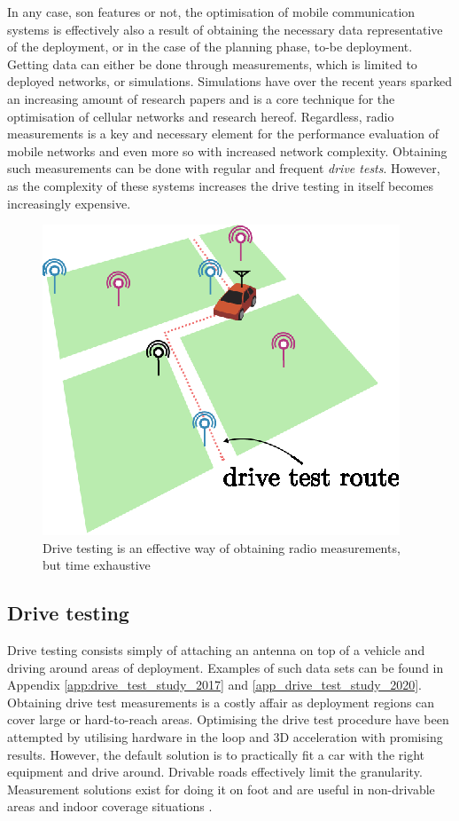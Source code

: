 In any case, \gls{son} features or not, the optimisation of mobile communication systems is effectively also a result of obtaining the necessary data representative of the deployment, or in the case of the planning phase, to-be deployment. Getting data can either be done through measurements, which is limited to deployed networks, or simulations. Simulations have over the recent years sparked an increasing amount of research papers and is a core technique for the optimisation of cellular networks and research hereof. Regardless, radio measurements is a key and necessary element for the performance evaluation of mobile networks and even more so with increased network complexity. Obtaining such measurements can be done with regular and frequent \emph{drive tests}. However, as the complexity of these systems increases the drive testing in itself becomes increasingly expensive. 
\begin{figure}
    \centering
    \includegraphics[width=.5\textwidth]{chapters/figures/drive_test_illustration.eps}
    \caption{Drive testing is an effective way of obtaining radio measurements, but time exhaustive}
    \label{fig:my_label}
\end{figure}

\subsection{Drive testing}\label{sec:drive_testing}
Drive testing consists simply of attaching an antenna on top of a vehicle and driving around areas of deployment. Examples of such data sets can be found in Appendix \ref{app:drive_test_study_2017} and \ref{app_drive_test_study_2020}. Obtaining drive test measurements is a costly affair as deployment regions can cover large or hard-to-reach areas. Optimising the drive test procedure have been attempted by utilising hardware in the loop and 3D acceleration \cite{Charitos2017} with promising results. However, the default solution is to practically fit a car with the right equipment and drive around. Drivable roads effectively limit the granularity. Measurement solutions exist for doing it on foot and are useful in non-drivable areas and indoor coverage situations \cite{ROMESmanual}. 

